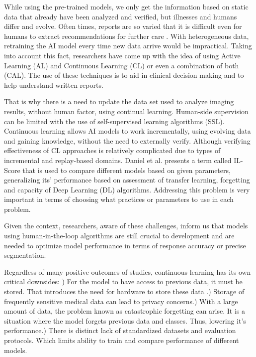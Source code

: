 \documentclass{IEEEcsmag}
\begin{document}
    While using the pre-trained models, we only get the information based on static data that already have been analyzed and verified, but illnesses and humans differ and evolve.
    Often times, reports are so varied that it is difficult even for humans to extract recommendations for further care \cite{cite-25}\cite{cite-9}.
    With heterogeneous data, retraining the AI model every time new data arrive would be impractical.
    Taking into account this fact, researchers have come up with the idea of using Active Learning (AL)\cite{cite-10}\cite{cite-19} and Continuous Learning (CL)\cite{cite-10}\cite{cite-19} or even a combination of both (CAL)\cite{cite-19}.
    The use of these techniques is to aid in clinical decision making\cite{cite-4} and to help understand written reports.
        
    That is why there is a need to update the data set used to analyze imaging results, without human factor, using continual learning.
    Human-side supervision can be limited with the use of self-supervised learning algorithms (SSL)\cite{cite-17}.
    Continuous learning allows AI models to work incrementally, using evolving data and gaining knowledge, without the need to externally verify.
    Although verifying effectiveness of CL approaches is relatively complicated due to types of incremental and replay-based domains.
    Daniel et al.\cite{cite-19} presents a term called IL-Score that is used to compare different models based on given parameters, generalizing its' performance based on assessment of transfer learning, forgetting and capacity of Deep Learning (DL) algorithms.
    Addressing this problem is very important in terms of choosing what practices or parameters to use in each problem.
    
    Given the context, researchers, aware of these challenges, inform us that models using human-in-the-loop algorithms\cite{cite-10} are still crucial to development and are needed to optimize model performance in terms of response accuracy or precise segmentation. 
    
    Regardless of many positive outcomes of studies, continuous learning has its own critical downsides: ) For the model to have access to previous data, it must be stored.
    That introduces the need for hardware to store these data \cite{cite-1}.) Storage of frequently sensitive medical data can lead to privacy concerns\cite{cite-1}.) With a large amount of data, the problem known as catastrophic forgetting can arise.
    It is a situation where the model forgets previous data and classes.
    Thus, lowering it's performance\cite{cite-1}.) There is distinct lack of standardized datasets and evaluation protocols.
    Which limits ability to train and compare performance of different models\cite{cite-2}\cite{cite-3}.
    
\end{document}

